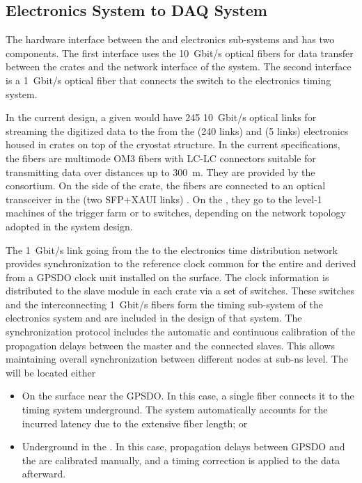 \subsection{Electronics System to DAQ System}
\label{ssec:dp-tpcelec-intfc-daq}

The hardware interface between the \dual {} and  electronics sub-systems and  has two components. The first interface uses the \SI{10}{Gbit/s} optical fibers for data transfer between the  crates and the network interface of the  system. The second interface is a \SI{1}{Gbit/s} optical fiber that connects the   switch to the \dual electronics timing system.   

In the current design, a given  would have \num{245} \SI{10}{Gbit/s} optical links for streaming the digitized data to the  from the  (\num{240} links) and  (\num{5} links) electronics housed in  crates on top of the cryostat structure.  In the current specifications, the fibers are multimode OM3 fibers \cite{om3fibers} with LC-LC connectors suitable for transmitting data over distances up to \SI{300}{\metre}.  They are provided by the  consortium. On the side of the  crate, the fibers are connected to an optical transceiver in the  (two SFP+XAUI links) \cite{natmch}.  On the , they go to the level-1 machines of the trigger farm or to switches, depending on the network topology adopted in the  system design.

The \SI{1}{Gbit/s} link going from the  to the \dual electronics time distribution network provides synchronization to the reference clock common for the entire  and derived from a GPSDO clock unit installed on the surface. The clock information is distributed to the  slave module in each  crate via a set of  switches. These switches and the interconnecting \SI{1}{Gbit/s} fibers form the timing sub-system of the \dual electronics system and are included in the design of that system. The  synchronization protocol includes the automatic and continuous calibration of the propagation delays between the master and the connected slaves. This allows maintaining overall synchronization between different nodes at sub-ns level. The  will be located either
\begin{itemize}
\item{On the surface near the GPSDO. In this case, a single fiber connects it to the \dual timing system underground. The system automatically accounts for the incurred latency due to the extensive fiber length; or}
\item{Underground in the . In this case, propagation delays between GPSDO and the  are calibrated manually, and a timing correction is applied to the data afterward.}
\end{itemize} 

